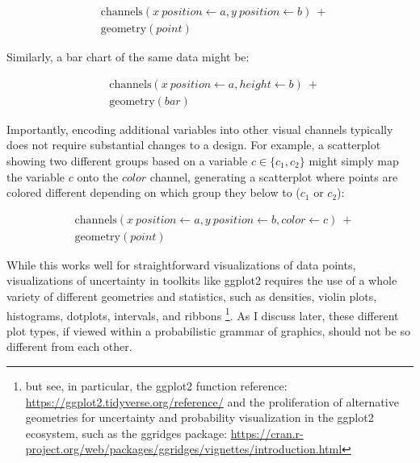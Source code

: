 \documentclass[11pt]{article}
\begin{document}
\begin{align*}
    &\textrm{channels}(x~position \leftarrow a, y~position \leftarrow b)~+\\
    &\textrm{geometry}(point) 
\end{align*}

Similarly, a bar chart of the same data might be:

\begin{align*}
    &\textrm{channels}(x~position \leftarrow a, height \leftarrow b)~+\\
    &\textrm{geometry}(bar) 
\end{align*}

Importantly, encoding additional variables into other visual channels typically does not require substantial changes to a design. For example, a scatterplot showing two different groups based on a variable $c \in \{c_1, c_2\}$ might simply map the variable $c$ onto the $color$ channel, generating a scatterplot where points are colored different depending on which group they below to ($c_1$ or $c_2$):

\begin{align*}
    &\textrm{channels}(x~position \leftarrow a, y~position \leftarrow b, color \leftarrow c)~+\\
    &\textrm{geometry}(point) 
\end{align*}

While this works well for straightforward visualizations of data points, visualizations of uncertainty in toolkits like ggplot2 requires the use of a whole variety of different geometries and statistics, such as densities, violin plots, histograms, dotplots, intervals, and ribbons \cite{wickham2016ggplot2}\footnote{but see, in particular, the ggplot2 function reference: \url{https://ggplot2.tidyverse.org/reference/} and the proliferation of alternative geometries for uncertainty and probability visualization in the ggplot2 ecosystem, such as the ggridges package: \url{https://cran.r-project.org/web/packages/ggridges/vignettes/introduction.html}}. As I discuss later, these different plot types, if viewed within a probabilistic grammar of graphics, should not be so different from each other.
\end{document}
